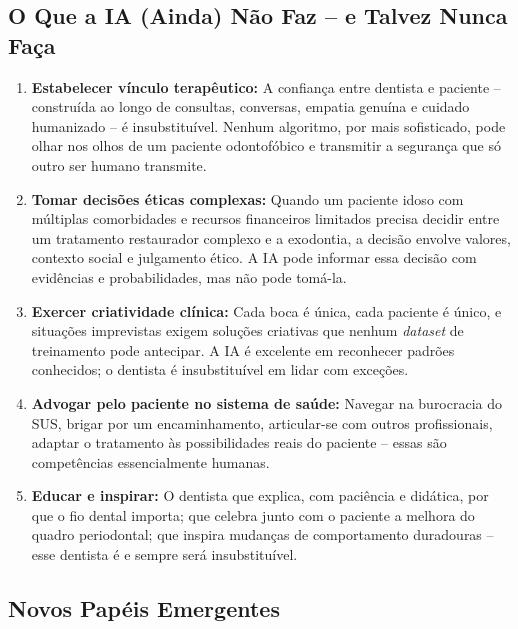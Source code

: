 \subsection{O Que a IA (Ainda) Não Faz -- e Talvez Nunca Faça}

\begin{enumerate}
  \item \textbf{Estabelecer vínculo terapêutico:} A confiança entre dentista e
    paciente -- construída ao longo de consultas, conversas, empatia genuína e
    cuidado humanizado -- é insubstituível. Nenhum algoritmo, por mais
    sofisticado, pode olhar nos olhos de um paciente odontofóbico e transmitir
    a segurança que só outro ser humano transmite.

  \item \textbf{Tomar decisões éticas complexas:} Quando um paciente idoso com
    múltiplas comorbidades e recursos financeiros limitados precisa decidir
    entre um tratamento restaurador complexo e a exodontia, a decisão envolve
    valores, contexto social e julgamento ético. A IA pode informar essa
    decisão com evidências e probabilidades, mas não pode tomá-la.

  \item \textbf{Exercer criatividade clínica:} Cada boca é única, cada paciente
    é único, e situações imprevistas exigem soluções criativas que nenhum
    \textit{dataset} de treinamento pode antecipar. A IA é excelente em
    reconhecer padrões conhecidos; o dentista é insubstituível em lidar com
    exceções.

  \item \textbf{Advogar pelo paciente no sistema de saúde:} Navegar na
    burocracia do SUS, brigar por um encaminhamento, articular-se com outros
    profissionais, adaptar o tratamento às possibilidades reais do paciente --
    essas são competências essencialmente humanas.

  \item \textbf{Educar e inspirar:} O dentista que explica, com paciência e
    didática, por que o fio dental importa; que celebra junto com o paciente
    a melhora do quadro periodontal; que inspira mudanças de comportamento
    duradouras -- esse dentista é e sempre será insubstituível.
\end{enumerate}

\subsection{Novos Papéis Emergentes}

